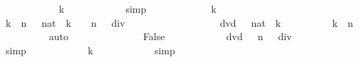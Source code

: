 \begin{isabellebody}
\ \ \ \ \ \ \isamarkupfalse%
\ {\isachardoublequoteopen}{}\ {\isacharasterisk}\ {}\ {\isacharcircum}\ k\ {\isasymin}\ {\isacharbraceleft}{\isacharbraceright}{\isachardoublequoteclose}\isanewline
\ \ \ \ \ \ \ \ \isamarkupfalse%
\ simp\isanewline
\ \ \ \ \isamarkupfalse%
\isanewline
\ \ \ \ \ \ \isamarkupfalse%
\ k\isanewline
\ \ \ \ \ \ \isamarkupfalse%
\ {\isachardoublequoteopen}k\ {\isasymin}\ {\isacharbraceleft}{}{\isachardot}{\isachardot}{\isacharless}n{\isacharbraceright}{\isachardoublequoteclose}\ {\isachardoublequoteopen}{}\ {\isacharasterisk}\ {\isacharparenleft}{}{\isacharcolon}{\isacharcolon}nat{\isacharparenright}\ {\isacharcircum}\ k\ {\isacharequal}\ {\isacharparenleft}{}\ {\isacharcircum}\ n\ {\isacharplus}\ {}{\isacharparenright}\ div\ {}\ {\isacharminus}\ {}{\isachardoublequoteclose}\isanewline
\ \ \ \ \ \ \isamarkupfalse%
\isanewline
\ \ \ \ \ \ \isamarkupfalse%
\ {\isachardoublequoteopen}{}\ dvd\ {}\ {\isacharasterisk}\ {\isacharparenleft}{}{\isacharcolon}{\isacharcolon}nat{\isacharparenright}\ {\isacharcircum}\ k{\isachardoublequoteclose}\isanewline
\ \ \ \ \ \ \ \ \isamarkupfalse%
\ {\isacharbackquoteopen}k\ {\isasymin}\ {\isacharbraceleft}{}{\isachardot}{\isachardot}{\isacharless}n{\isacharbraceright}{\isacharbackquoteclose}\isanewline
\ \ \ \ \ \ \ \ \isamarkupfalse%
\ auto\isanewline
\ \ \ \ \ \ \isamarkupfalse%
\isanewline
\ \ \ \ \ \ \isamarkupfalse%
\ False\isanewline
\ \ \ \ \ \ \ \ \isamarkupfalse%
\ {\isacharbackquoteopen}{\isasymnot}\ {}\ dvd\ {\isacharparenleft}{}\ {\isacharcircum}\ n\ {\isacharplus}\ {}{\isacharparenright}\ div\ {}\ {\isacharminus}\ {}{\isacharbackquoteclose}\isanewline
\ \ \ \ \ \ \ \ \isamarkupfalse%
\ simp\isanewline
\ \ \ \ \ \ \isamarkupfalse%
\ {\isachardoublequoteopen}{}\ {\isacharasterisk}\ {}\ {\isacharcircum}\ k\ {\isasymin}\ {\isacharbraceleft}{\isacharbraceright}{\isachardoublequoteclose}\isanewline
\ \ \ \ \ \ \ \ \isamarkupfalse%
\ simp\isanewline
\ \ \ \ \isamarkupfalse%
\isanewline
\isanewline
\ \ \ \ \isamarkupfalse%
\isanewline
\ \ \ \ \isamarkupfalse%

\end{isabellebody}
